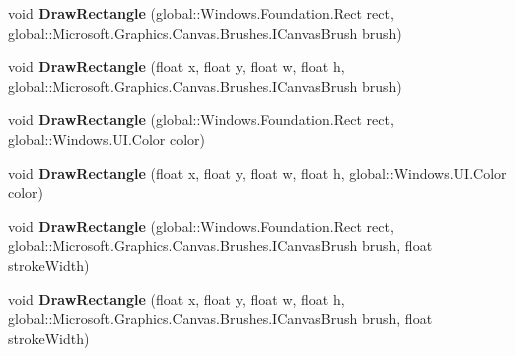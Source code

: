 \begin{DoxyCompactItemize}
\item 
\mbox{\label{class_microsoft_1_1_graphics_1_1_canvas_1_1_canvas_drawing_session_a3c083e838e6629adba295220fa84faef}} 
void {\bfseries Draw\+Rectangle} (global\+::\+Windows.\+Foundation.\+Rect rect, global\+::\+Microsoft.\+Graphics.\+Canvas.\+Brushes.\+I\+Canvas\+Brush brush)
\item 
\mbox{\label{class_microsoft_1_1_graphics_1_1_canvas_1_1_canvas_drawing_session_ad0fff7fdfb1a558ecd40bfa74e0d8baf}} 
void {\bfseries Draw\+Rectangle} (float x, float y, float w, float h, global\+::\+Microsoft.\+Graphics.\+Canvas.\+Brushes.\+I\+Canvas\+Brush brush)
\item 
\mbox{\label{class_microsoft_1_1_graphics_1_1_canvas_1_1_canvas_drawing_session_a2a920d747185a3bcf7ffa588516b9358}} 
void {\bfseries Draw\+Rectangle} (global\+::\+Windows.\+Foundation.\+Rect rect, global\+::\+Windows.\+U\+I.\+Color color)
\item 
\mbox{\label{class_microsoft_1_1_graphics_1_1_canvas_1_1_canvas_drawing_session_a96a8c0094f87cd750ce845265c86cd4d}} 
void {\bfseries Draw\+Rectangle} (float x, float y, float w, float h, global\+::\+Windows.\+U\+I.\+Color color)
\item 
\mbox{\label{class_microsoft_1_1_graphics_1_1_canvas_1_1_canvas_drawing_session_af36bf12f3dd3cc8de5d5e6410229d617}} 
void {\bfseries Draw\+Rectangle} (global\+::\+Windows.\+Foundation.\+Rect rect, global\+::\+Microsoft.\+Graphics.\+Canvas.\+Brushes.\+I\+Canvas\+Brush brush, float stroke\+Width)
\item 
\mbox{\label{class_microsoft_1_1_graphics_1_1_canvas_1_1_canvas_drawing_session_adca9b6d1f0dac2e91e424c53f5a2f188}} 
void {\bfseries Draw\+Rectangle} (float x, float y, float w, float h, global\+::\+Microsoft.\+Graphics.\+Canvas.\+Brushes.\+I\+Canvas\+Brush brush, float stroke\+Width)
\item 

\end{DoxyCompactItemize}
